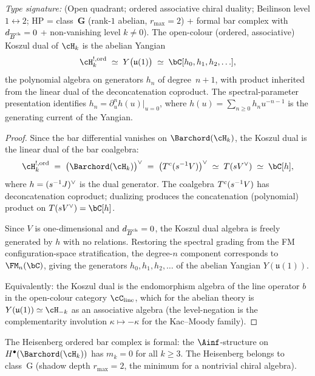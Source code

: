 \begin{theorem}
\label{thm:heisenberg-yangian}
\emph{Type signature:} (Open quadrant; ordered associative chiral
duality; Beilinson level $1\!\leftrightarrow\!2$; HP =
class~$\mathbf G$ \textup{(}rank-$1$ abelian, $r_{\max}=2$\textup{)}
+ formal bar complex with $d_{\overline{B}^{\mathrm{ch}}}=0$ + non-vanishing level
$k\neq 0$).
The open-colour \textup{(}ordered, associative\textup{)} Koszul
dual of $\cH_k$ is the abelian Yangian
\begin{equation}\label{eq:heisenberg-yangian}
\cH_k^{!,\mathrm{ord}}
\;\simeq\;
Y\bigl(\mathfrak{u}(1)\bigr)
\;\simeq\;
\bC[h_0, h_1, h_2, \ldots],
\end{equation}
the polynomial algebra on generators $h_n$ of degree~$n+1$,
with product inherited from the linear dual of the
deconcatenation coproduct. The spectral-parameter
presentation identifies $h_n = \partial_u^n h(u)|_{u=0}$,
where $h(u) = \sum_{n\ge 0} h_n u^{-n-1}$ is the generating
current of the Yangian.
\end{theorem}

\begin{proof}
Since the bar differential vanishes on $\Barchord(\cH_k)$,
the Koszul dual is the linear dual of the bar coalgebra:
\[
\cH_k^{!,\mathrm{ord}}
\;=\;
\bigl(\Barchord(\cH_k)\bigr)^\vee
\;=\;
\bigl(T^c(\susp^{-1}V)\bigr)^\vee
\;\simeq\;
T(\susp V^\vee)
\;\simeq\;
\bC[h],
\]
where $h = (s^{-1}J)^\vee$ is the dual generator.
The coalgebra $T^c(s^{-1}V)$ has deconcatenation
coproduct; dualizing produces the concatenation
(polynomial) product on $T(\susp V^\vee) = \bC[h]$.

Since $V$ is one-dimensional and $d_{\overline{B}^{\mathrm{ch}}} = 0$,
the Koszul dual algebra is freely generated by $h$ with
no relations. Restoring the spectral grading from the
FM configuration-space stratification, the degree-$n$
component corresponds to $\FM_n(\bC)$, giving the
generators $h_0, h_1, h_2, \ldots$ of the abelian
Yangian $Y(\mathfrak{u}(1))$.

Equivalently: the Koszul dual is the endomorphism algebra
of the line operator $b$ in the open-colour category
$\cC_{\mathrm{line}}$, which for the abelian theory is
$Y(\mathfrak{u}(1)) \simeq \cH_{-k}$ as an associative
algebra (the level-negation is the complementarity
involution $\kappa\mapsto -\kappa$ for the Kac--Moody
family).
\end{proof}

\begin{theorem}
\label{thm:heisenberg-formality}
The Heisenberg ordered bar complex is formal:
the $\Ainf$-structure on $H^\bullet(\Barchord(\cH_k))$
has $m_k = 0$ for all $k\ge 3$. The Heisenberg
belongs to class~G \textup{(}shadow depth $r_{\max} = 2$,
the minimum for a nontrivial chiral algebra\textup{)}.
\end{theorem}

